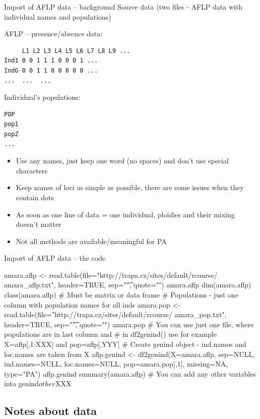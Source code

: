 \documentclass[compress, ucs, xelatex, 11pt, xcolor=svgnames,
  hyperref={
    bookmarks=true,
    unicode=true,
    colorlinks=true,
    pdftitle={Molecular data in R},
    plainpages=false,
    pdfauthor={Vojtech Zeisek},
    pdfsubject={Course about phylogeny and evolution in R},
    pdfcreator={XeLaTeX},
    pdfkeywords={R, evolution, phylogeny, molecular data},
    linkcolor=Tomato,
    anchorcolor=SaddleBrown,
    citecolor=Goldenrod,
    filecolor=DarkMagenta,
    menucolor=Sienna,
    urlcolor=DarkTurquoise,
    pdftex},
  url={hyphens, lowtilde} %
  ]{beamer}
\begin{document}
\begin{frame}[fragile]{Import of AFLP data -- background}
Source data (two files - AFLP data with individual names and populations)
\begin{multicols}{2}
AFLP -- presence/absence data:
\begin{verbatim}
     L1 L2 L3 L4 L5 L6 L7 L8 L9 ...
Ind1 0 0 1 1 1 0 0 0 1 ...
IndG 0 0 1 1 0 0 0 0 0 ...
...  ...  ...
\end{verbatim}
Individual's populations:
\begin{verbatim}
POP
pop1
popZ
...
\end{verbatim}
\columnbreak
\begin{itemize}
 \item Use any names, just keep one word (no spaces) and don't use special characters
 \item Keep names of loci as simple as possible, there are some issues when they contain dots
 \item As soon as one line of data = one individual, ploidies and their mixing doesn't matter
 \item Not all methods are available/meaningful for PA
\end{itemize}
\end{multicols}
\end{frame}

\begin{frame}[fragile]{Import of AFLP data -- the code}
  \begin{spluscode}
    amara.aflp <- read.table(file="http://trapa.cz/sites/default/rcourse/
      amara_aflp.txt", header=TRUE, sep="\t", quote="")
    amara.aflp
    dim(amara.aflp)
    class(amara.aflp) # Must be matrix or data frame
    # Populations - just one column with population names for all inds
    amara.pop <- read.table(file="http://trapa.cz/sites/default/rcourse/
      amara_pop.txt", header=TRUE, sep="\t", quote="")
    amara.pop
    # You can use just one file, where populations are in last column and
    # in df2genind() use for example X=aflp[,1:XXX] and pop=aflp[,YYY]
    # Create genind object - ind.names and loc.names are taken from X
    aflp.genind <- df2genind(X=amara.aflp, sep=NULL, ind.names=NULL,
      loc.names=NULL, pop=amara.pop[,1], missing=NA, type="PA")
    aflp.genind
    summary(amara.aflp)
    # You can add any other variables into genind$other$XXX
  \end{spluscode}
\end{frame}

\subsection{Notes about data}
\end{document}
